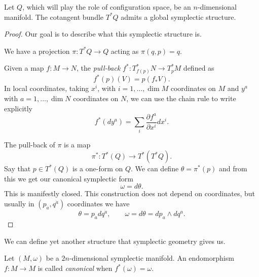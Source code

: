 \begin{claim}
  Let $Q$, which will play the role of configuration space, be an $n$-dimensional manifold.
  The cotangent bundle $T^* Q$ admits a global symplectic structure.
\end{claim}
\begin{proof}
  Our goal is to describe what this symplectic structure is.
  \begin{figure}[tbhp]
    \centering
    \def\svgwidth{0.6\columnwidth}
    
    \caption{}
    \label{fig:l7f1}
  \end{figure}
  We have a projection $\pi \colon T^* Q \to Q$ acting as $\pi(q, p) = q$. 
  \begin{definition}
    Given a map $f \colon M \to N$, the  \emph{pull-back} $f^* \colon T^*_{f(p)} N \to T_p^* M$  defined as
    \begin{equation}
      f^*(p) (V) = p(f_* V).
    \end{equation}
    In local coordinates, taking $x^i$, with  $i = 1, \dots, \dim M$  coordinates on $M$ and  $y^a$ with  $a = 1, \dots, \dim N$  coordinates on $N$, we can use the chain rule to write explicitly
     \begin{equation}
      f^*(dy^a) = \sum_i \frac{\partial f^a}{\partial x^{i}} dx^{i}.
    \end{equation}
  \end{definition}

  The pull-back of $\pi$ is a map
  \begin{equation}
    \pi^* \colon T^*(Q) \to T^* (T^* Q).
  \end{equation}
  Say that $p \in T^* (Q)$ is a one-form on $Q$. We can define $\theta = \pi^* (p)$ and from this we get our canonical symplectic form
  \begin{equation}
    \omega = d \theta.
  \end{equation}
  This is manifestly closed.
  This construction does not depend on coordinates, but usually in $(p_{\dot{a}}, q^{\dot{a}})$ coordinates we have
  \begin{equation}
    \theta = p_{\dot{a}} dq^{\dot{a}}, \qquad \omega = d\theta = dp_a \wedge dq^a.
  \end{equation}
\end{proof}

We can define yet another structure that symplectic geometry gives us.
\begin{definition}
  Let $(M, \omega)$ be a $2n$-dimensional symplectic manifold. An endomorphism $f \colon M \to M$ is called \emph{canonical} when $f^* (\omega) = \omega$.
\end{definition}


